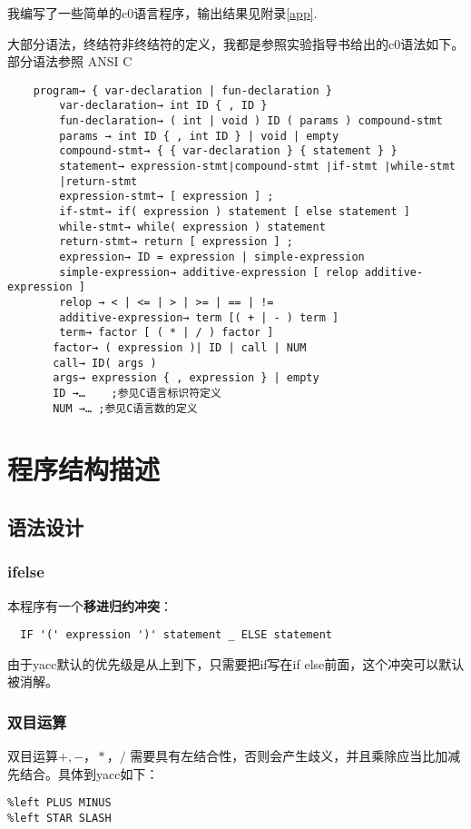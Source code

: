 \documentclass{article}
\begin{document}
\begin{CJK}{UTF8}{gkai}
我编写了一些简单的c0语言程序，输出结果见附录\ref{app}.

大部分语法，终结符非终结符的定义，我都是参照实验指导书给出的c0语法如下。部分语法参照 ANSI C \cite{ansic}
\begin{verbatim}
    program→ { var-declaration | fun-declaration }
        var-declaration→ int ID { , ID }    
        fun-declaration→ ( int | void ) ID ( params ) compound-stmt
        params → int ID { , int ID } | void | empty
        compound-stmt→ { { var-declaration } { statement } }
        statement→ expression-stmt∣compound-stmt ∣if-stmt ∣while-stmt 
        |return-stmt 
        expression-stmt→ [ expression ] ; 
        if-stmt→ if( expression ) statement [ else statement ]
        while-stmt→ while( expression ) statement 
        return-stmt→ return [ expression ] ;
        expression→ ID = expression | simple-expression
        simple-expression→ additive-expression [ relop additive-expression ]
        relop → < | <= | > | >= | == | != 
        additive-expression→ term [( + | - ) term ]
        term→ factor [ ( * | / ) factor ]
       factor→ ( expression )| ID | call | NUM
       call→ ID( args ) 
       args→ expression { , expression } | empty
       ID →…	;参见C语言标识符定义
       NUM →… ;参见C语言数的定义
\end{verbatim}

\section{程序结构描述}
\subsection{语法设计}
\subsubsection{ifelse}
本程序有一个\textbf{移进归约冲突}：
\begin{verbatim}
  IF '(' expression ')' statement _ ELSE statement
\end{verbatim}
由于yacc默认的优先级是从上到下，只需要把if写在if else前面，这个冲突可以默认被消解。
\subsubsection{双目运算}
双目运算$+,-，*，/$ 需要具有左结合性，否则会产生歧义，并且乘除应当比加减先结合。具体到yacc如下：
\begin{verbatim}
%left PLUS MINUS
%left STAR SLASH
\end{verbatim}


\end{CJK}
\end{document}
